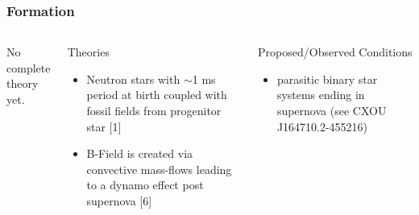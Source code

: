 \documentclass[hyperref=pdftex, presentation]{beamer}
\begin{document}
\begin{frame}{}
\frametitle{\Large Formation}
\begin{columns}[c] %

No complete theory yet.
\begin{block}{Theories}
\begin{itemize}
 \item<2-> Neutron stars with $\sim$1 ms period at birth coupled with fossil fields from progenitor star [1]%
 \item<4-> B-Field is created via convective mass-flows leading to a dynamo effect post supernova [6]
\end{itemize}
\end{block}
\begin{block}{Proposed/Observed Conditions}
\begin{itemize}
	\item<3-> parasitic binary star systems ending in supernova (see CXOU J164710.2-455216) %
\end{itemize}
\end{block}


\end{columns}
\end{frame}
\end{document}
